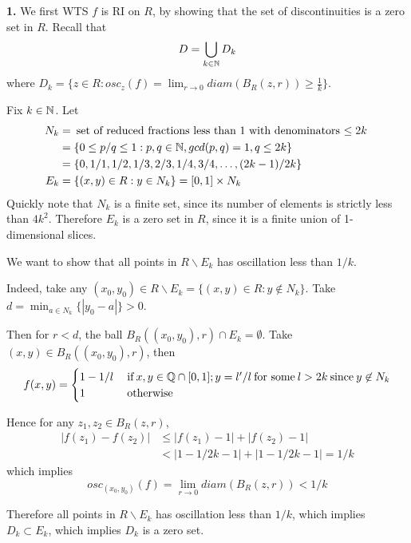 \documentclass[a4paper, 12pt]{article}
\begin{document}
\begin{solution}
    \textbf{1.} We first WTS $f$ is RI on $R$, by showing that the set of discontinuities is a zero set in $R$. Recall that \[
        D = \bigcup_{k \in \mathbb{N}}D_k
    \]
    where $D_k = \{z \in R: osc_z (f) = \lim_{r \to 0} diam (B_R(z, r)) \geq \frac{1}{k}\}$.

    Fix $k \in \mathbb{N}$. Let \begin{align*}
        N_k & = \:\text{set of reduced fractions less than 1 with denominators $\leq 2k$}\: \\
            & = \{ 0 \leq p/q \leq 1 : p, q \in \mathbb{N}, gcd(p, q) = 1, q \leq 2k\}            \\
            & = \{0, 1/1, 1/2, 1/3, 2/3, 1/4, 3/4, \ldots, (2k-1)/2k\}                      \\
        E_k & = \{(x, y) \in R: y \in N_k\} = [0, 1] \times N_k
    \end{align*}
    Quickly note that $N_k$ is a finite set, since its number of elements is strictly less than $4k^2$. Therefore $E_k$ is a zero set in $R$, since it is a finite union of 1-dimensional slices.


    We want to show that all points in $R \backslash E_k$ has oscillation less than $1/k$.

    Indeed, take any $(x_0, y_0) \in R \backslash E_k = \{(x, y) \in R: y \not \in N_k\}$. Take $d = \min_{a \in N_k}\{|y_0 - a|\} > 0$.

    Then for $r < d$, the ball $B_R((x_0, y_0), r) \cap E_k = \emptyset$. Take $(x, y)\in B_R((x_0, y_0), r)$, then  \[
        f(x, y) = \begin{cases}
            1 - 1/l & \:\text{if}\: x, y \in \mathbb{Q} \cap [0, 1]; y = l'/l \:\text{for some}\: l > 2k \:\text{since}\: y \not \in N_k \\
            1       & \:\text{otherwise}\:
        \end{cases}
    \]

    Hence for any $z_1, z_2 \in B_R(z, r)$,
    \begin{align*}
        |f(z_1) - f(z_2)| & \leq |f(z_1) - 1| + |f(z_2) - 1|        \\
                          & < |1 - 1/2k - 1| + |1 - 1/2k - 1| = 1/k
    \end{align*}
    which implies \[
        osc_{(x_0, y_0)}(f) = \lim_{r \to 0} diam(B_R(z, r)) < 1/k
    \]

    Therefore all points in $R \backslash E_k$ has oscillation less than $1/k$, which implies $D_k \subset E_k$, which implies $D_k$ is a zero set.


\end{solution}
\end{document}
